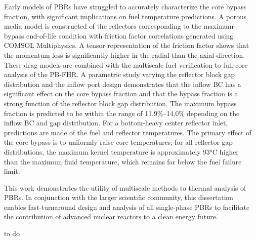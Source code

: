 \documentclass{ucbthesis}
\begin{document}
Early models of PBRs have struggled to accurately characterize the core bypass fraction, with significant implications on fuel temperature predictions. A porous media model is constructed of the reflectors corresponding to the maximum-bypass end-of-life condition with friction factor correlations generated using COMSOL Multiphysics. A tensor representation of the friction factor shows that the momentum loss is significantly higher in the radial than the axial direction. These drag models are combined with the multiscale fuel verification to full-core analysis of the PB-FHR. A parametric study varying the reflector block gap distribution and the inflow port design demonstrates that the inflow BC has a significant effect on the core bypass fraction and that the bypass fraction is a strong function of the reflector block gap distribution. The maximum bypass fraction is predicted to be within the range of 11.9\%--14.0\% depending on the inflow BC and gap distribution. For a bottom-heavy center reflector inlet, predictions are made of the fuel and reflector temperatures. The primary effect of the core bypass is to uniformly raise core temperatures; for all reflector gap distributions, the maximum kernel temperature is approximately 93\si{\celsius} higher than the maximum fluid temperature, which remains far below the fuel failure limit.

This work demonstrates the utility of multiscale methods to thermal analysis of PBRs. In conjunction with the larger scientific community, this dissertation enables fast-turnaround design and analysis of all single-phase PBRs to facilitate the contribution of advanced nuclear reactors to a clean energy future. 

\begin{frontmatter}

\begin{comment}
\begin{dedication}
\null\vfil
\begin{center}
To my family and friends\\\vspace{12pt}
\end{center}
\vfil\null
\end{dedication}
\end{comment}


\clearpage
\begin{KeepFromToc}
\tableofcontents
\end{KeepFromToc}
\clearpage

\clearpage
\printglossary[style=mystyle]

\clearpage


\clearpage



\begin{acknowledgements}
to do
\end{acknowledgements}

\end{frontmatter}
\end{document}
